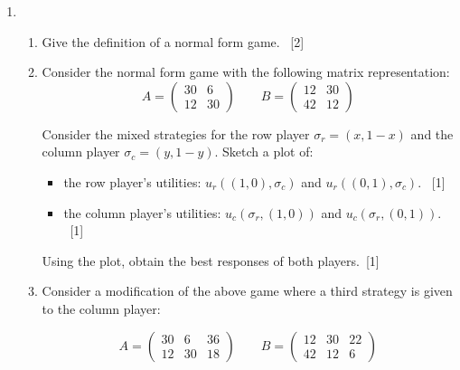\documentclass[12pt,a4paper]{article}
\renewcommand{\labelenumi}{\arabic{enumi}} %
\begin{document}
\null \vskip1cm
\begin{enumerate}

\renewcommand\labelenumi{\bfseries\theenumi.}

\item

    \begin{enumerate}
        \item Give the definition of a normal form game.
        ~\hfill{[2]}
        \item Consider the normal form game with
            the following matrix representation:
            $$A=
                \begin{pmatrix}
                    30 & 6\\
                    12 & 30
                \end{pmatrix}
              \qquad
              B=
                \begin{pmatrix}
                    12 & 30\\
                    42 & 12
                \end{pmatrix}
            $$

            Consider the mixed strategies for the row player
            \(\sigma_r=(x,1-x)\) and the column player \(\sigma_c=(y,1-y)\).
            Sketch a plot of:

            \begin{itemize}
                \item the row player's utilities: \(u_r((1, 0), \sigma_c)\)
                    and \(u_r((0, 1), \sigma_c)\).
                    ~\hfill{[1]}
                \item the column player's utilities: \(u_c(\sigma_r, (1, 0))\)
                    and \(u_c(\sigma_r, (0, 1))\).
                    ~\hfill{[1]}
            \end{itemize}

            Using the plot, obtain the best responses of both
            players.~\hfill{[1]}

        \item Consider a modification of the above game where a third strategy
            is given to the column player:

            $$A=
                \begin{pmatrix}
                    30 & 6 & 36\\
                    12 & 30 & 18
                \end{pmatrix}
              \qquad
              B=
                \begin{pmatrix}
                    12 & 30 & 22\\
                    42 & 12 & 6
                \end{pmatrix}
            $$


\end{enumerate}
\end{enumerate}
\end{document}
